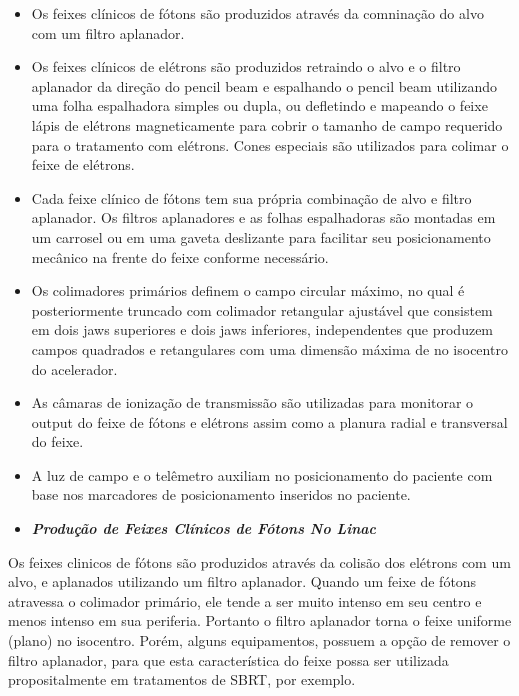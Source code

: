 \documentclass[11pt,a4paper]{article}
\newcounter{exemplo}
\begin{document}
                    \begin{itemize}
                        \item Os feixes clínicos de fótons são produzidos através da comninação do alvo com um filtro aplanador.
                        \item Os feixes clínicos de elétrons são produzidos retraindo o alvo e o filtro aplanador da direção do pencil beam e espalhando o pencil beam utilizando uma folha espalhadora simples ou dupla, ou defletindo e mapeando o feixe lápis de elétrons magneticamente para cobrir o tamanho de campo requerido para o tratamento com elétrons. Cones especiais são utilizados para colimar o feixe de elétrons.
                        \item Cada feixe clínico de fótons tem sua própria combinação de alvo e filtro aplanador. Os filtros aplanadores e as folhas espalhadoras são montadas em um carrosel ou em uma gaveta deslizante para facilitar seu posicionamento mecânico na frente do feixe conforme necessário.
                        \item Os colimadores primários definem o campo circular máximo, no qual é posteriormente truncado com colimador retangular ajustável que consistem em dois jaws superiores e dois jaws inferiores, independentes que produzem campos quadrados e retangulares com uma dimensão máxima de  no isocentro do acelerador.
                        \item As câmaras de ionização de transmissão são utilizadas para monitorar o output do feixe de fótons e elétrons assim como a planura radial e transversal do feixe.
                        \item A luz de campo e o telêmetro auxiliam no posicionamento do paciente com base nos marcadores de posicionamento inseridos no paciente.
                    \end{itemize}
                    
                \begin{itemize}
                    \item \textbf{\textit{\textcolor{CarnationPink}{Produção de Feixes Clínicos de Fótons No Linac}}}
                \end{itemize}

                    Os feixes clinicos de fótons são produzidos através da colisão dos elétrons com um alvo, e aplanados utilizando um filtro aplanador. Quando um feixe de fótons atravessa o colimador primário, ele tende a ser muito intenso em seu centro e menos intenso em sua periferia. Portanto o filtro aplanador torna o feixe uniforme (plano) no isocentro. Porém, alguns equipamentos, possuem a opção de remover o filtro aplanador, para que esta característica do feixe possa ser utilizada propositalmente em tratamentos de SBRT, por exemplo.
                    
\end{document}
